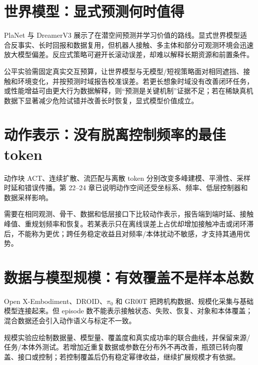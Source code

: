 \section{世界模型：显式预测何时值得}

PlaNet 与 DreamerV3 展示了在潜空间预测并学习价值的路线\cite{hafner2019planet,hafner2023dreamerv3}。显式世界模型适合反事实、长时回报和数据复用，但机器人接触、多主体和部分可观测环境会迅速放大模型偏差。反应式策略可避开长滚动误差，却难以解释长期资源和前置条件。

公平实验需固定真实交互预算，让世界模型与无模型/短视策略面对相同遮挡、接触和环境变化，并按预测时域报告校准误差。若更长想象时域没有改善闭环任务，或性能增益可由更大行为数据解释，则“预测是关键机制”证据不足；若在稀缺真机数据下显著减少危险试错并改善长时恢复，显式模型价值成立。

\section{动作表示：没有脱离控制频率的最佳 token}

动作块 ACT、连续扩散、流匹配与离散 token 分别改变多峰建模、平滑性、采样时延和错误传播\cite{zhao2023act,chi2023diffusionpolicy,lipman2023flowmatching,pertsch2025fast}。第 22--24 章已说明动作空间还受坐标系、频率、低层控制器和数据采样影响。

需要在相同观测、骨干、数据和低层接口下比较动作表示，报告端到端时延、接触峰值、重规划频率和恢复。若某表示只在离线误差上占优却增加接触冲击或闭环滞后，不能称为更优；跨任务稳定收益且对频率/本体扰动不敏感，才支持其通用优势。

\section{数据与模型规模：有效覆盖不是样本总数}

Open X-Embodiment、DROID、$\pi_0$ 和 GR00T 把跨机构数据、规模化采集与基础模型连接起来\cite{openx2024,khazatsky2024droid,black2024pi0,nvidia2025groot}。但 episode 数不能表示接触状态、失败、恢复、对象和本体覆盖；混合数据还会引入动作语义与标定不一致。

规模实验应绘制数据量、模型量、覆盖度和真实成功率的联合曲线，并保留来源/任务/本体外测试。若增加近重复数据或参数在分布外不再改善，瓶颈已转向覆盖、接口或控制；若控制覆盖后仍有稳定幂律收益，继续扩展规模才有依据。

